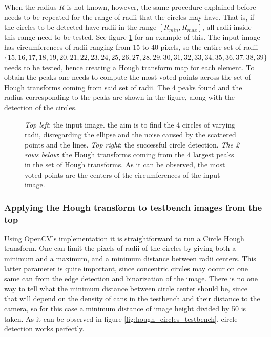 \documentclass[../main.tex]{subfiles}
\begin{document}
When the radius $R$ is not known, however, the same procedure explained before needs to be repeated for the range of radii that the circles may have. That is, if the circles to be detected have radii in the range $[R_{min}, R_{max}]$, all radii inside this range need to be tested. See figure \ref{fig:hough_demo_all_circles} for an example of this. The input image has circumferences of radii ranging from 15 to 40 pixels, so the entire set of radii $\{15, 16, 17, 18, 19, 20, 21, 22, 23, 24, 25, 26, 27, 28, 29, 30, 31, 32, 33, 34, 35, 36, 37, 38, 39\}$ needs to be tested, hence creating a Hough transform map for each element. To obtain the peaks one needs to compute the most voted points across the set of Hough transforms coming from said set of radii. The 4 peaks found and the radius corresponding to the peaks are shown in the figure, along with the detection of the circles.

\begin{figure}[htbp]
    \centering
    \caption{\emph{Top left}: the input image. the aim is to find the 4 circles of varying radii, disregarding the ellipse and the noise caused by the scattered points and the lines. \emph{Top right}: the successful circle detection. \emph{The 2 rows below}: the Hough transforms coming from the 4 largest peaks in the set of Hough transforms. As it can be observed, the most voted points are the centers of the circumferences of the input image.}
    \label{fig:hough_demo_all_circles}
\end{figure}

\subsubsection{Applying the Hough transform to testbench images from the top}
Using OpenCV's implementation it is straightforward to run a Circle Hough transform. One can limit the pixels of radii of the circles by giving both a minimum and a maximum, and a minimum distance between radii centers. This latter parameter is quite important, since concentric circles may occur on one same can from the edge detection and binarization of the image. There is no one way to tell what the minimum distance between circle center should be, since that will depend on the density of cans in the testbench and their distance to the camera, so for this case a minimum distance of image height divided by 50 is taken. As it can be observed in figure \ref{fig:hough_circles_testbench}, circle detection works perfectly.
\end{document}
